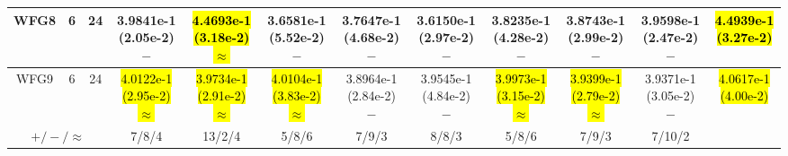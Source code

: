 \documentclass[journal]{IEEEtran}
\begin{document}
\begin{table*}[htbp]
\begin{tabular}{cccccccccccc}
\hline
\multirow{1}{*}{WFG8}&6&24&3.9841e-1 (2.05e-2) $-$&\hl{4.4693e-1 (3.18e-2) $\approx$}&3.6581e-1 (5.52e-2) $-$&3.7647e-1 (4.68e-2) $-$&3.6150e-1 (2.97e-2) $-$&3.8235e-1 (4.28e-2) $-$&3.8743e-1 (2.99e-2) $-$&3.9598e-1 (2.47e-2) $-$&\hl{4.4939e-1 (3.27e-2)}\\
\hline
\multirow{1}{*}{WFG9}&6&24&\hl{4.0122e-1 (2.95e-2) $\approx$}&\hl{3.9734e-1 (2.91e-2) $\approx$}&\hl{4.0104e-1 (3.83e-2) $\approx$}&3.8964e-1 (2.84e-2) $-$&3.9545e-1 (4.84e-2) $-$&\hl{3.9973e-1 (3.15e-2) $\approx$}&\hl{3.9399e-1 (2.79e-2) $\approx$}&3.9371e-1 (3.05e-2) $-$&\hl{4.0617e-1 (4.00e-2)}\\
\hline
\multicolumn{3}{c}{$+/-/\approx$}&7/8/4&13/2/4&5/8/6&7/9/3&8/8/3&5/8/6&7/9/3&7/10/2&\\
\bottomrule
\end{tabular}
\label{No Label}
\end{table*}
\end{document}
